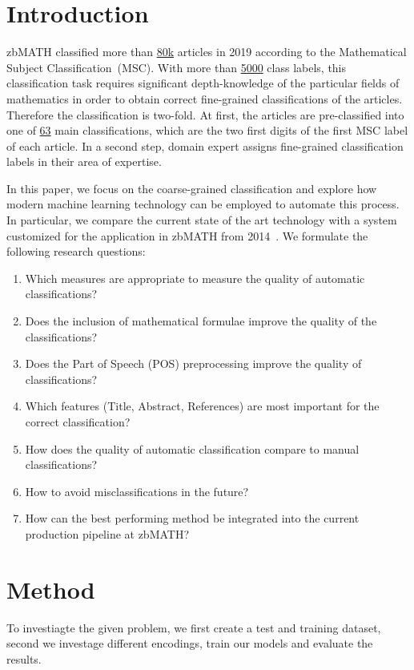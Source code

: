 \section{Introduction}\label{sec:intro}
zbMATH classified more than 
\href{https://zbmath.org/?q=%2A+py%3A2019}%
{80k} articles in 2019 according to the Mathematical Subject Classification~(MSC).
With more than
\href{https://msc2020.org}%
{5000} class labels, this classification task requires significant depth-knowledge of the particular fields of mathematics in order to obtain correct fine-grained classifications of the articles.
Therefore the classification is two-fold.
At first, the articles are pre-classified into one of \href{https://msc2020.org}%
{63} main classifications, which are the two first digits of the first MSC label of each article.
In a second step, domain expert assigns fine-grained classification labels in their area of expertise.

In this paper, we focus on the coarse-grained classification and explore how modern machine learning technology can be employed to automate this process.
In particular, we compare the current state of the art technology with a system customized for the application in zbMATH from 2014~\cite{SchonebergS14}.
We formulate the following research questions:
\begin{enumerate}
  \item Which measures are appropriate to measure the quality of automatic classifications?
  \item Does the inclusion of mathematical formulae improve the quality of the classifications?
  \item Does the Part of Speech (POS) preprocessing improve the quality of classifications?
  \item Which features (Title, Abstract, References) are most important for the correct classification?
  \item How does the quality of automatic classification compare to manual classifications?
  \item How to avoid misclassifications in the future?
  \item How can the best performing method be integrated into the current production pipeline at zbMATH?
\end{enumerate}
\section{Method}\label{sec:method}
To investiagte the given problem, we first create a test and training dataset, second we investage different encodings, train our models and evaluate the results.
